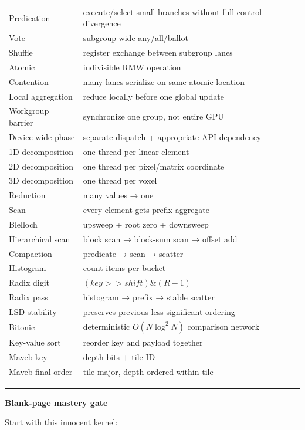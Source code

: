 {\begin{longtable}[]{@{}
  >{\raggedright\arraybackslash}p{}
  >{\raggedright\arraybackslash}p{}@{}}
Predication & execute/select small branches without full control divergence \\
Vote & subgroup-wide any/all/ballot \\
Shuffle & register exchange between subgroup lanes \\
Atomic & indivisible RMW operation \\
Contention & many lanes serialize on same atomic location \\
Local aggregation & reduce locally before one global update \\
Workgroup barrier & synchronize one group, not entire GPU \\
Device-wide phase & separate dispatch + appropriate API dependency \\
1D decomposition & one thread per linear element \\
2D decomposition & one thread per pixel/matrix coordinate \\
3D decomposition & one thread per voxel \\
Reduction & many values → one \\
Scan & every element gets prefix aggregate \\
Blelloch & upsweep + root zero + downsweep \\
Hierarchical scan & block scan → block-sum scan → offset add \\
Compaction & predicate → scan → scatter \\
Histogram & count items per bucket \\
Radix digit & \((key>>shift)\&(R-1)\) \\
Radix pass & histogram → prefix → stable scatter \\
LSD stability & preserves previous less-significant ordering \\
Bitonic & deterministic \(O(N\log^2N)\) comparison network \\
Key-value sort & reorder key and payload together \\
Maveb key & depth bits + tile ID \\
Maveb final order & tile-major, depth-ordered within tile \\
\end{longtable}
}

\begin{center}\rule{0.5\linewidth}{0.5pt}\end{center}

\textbf{Blank-page mastery gate}

Start with this innocent kernel:

